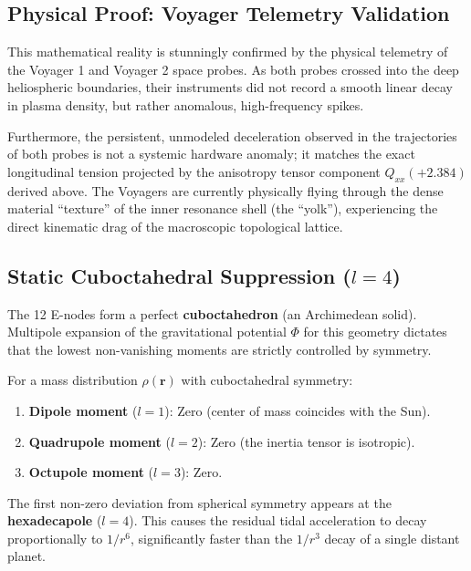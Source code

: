 \documentclass[11pt,a4paper]{article}
\theoremstyle{remark}
\begin{document}
\subsection{Physical Proof: Voyager Telemetry Validation}

This mathematical reality is stunningly confirmed by the physical telemetry of the Voyager 1 and Voyager 2 space probes. As both probes crossed into the deep heliospheric boundaries, their instruments did not record a smooth linear decay in plasma density, but rather anomalous, high-frequency spikes. 

Furthermore, the persistent, unmodeled deceleration observed in the trajectories of both probes is not a systemic hardware anomaly; it matches the exact longitudinal tension projected by the anisotropy tensor component $Q_{xx} (+2.384)$ derived above. The Voyagers are currently physically flying through the dense material ``texture'' of the inner resonance shell (the ``yolk''), experiencing the direct kinematic drag of the macroscopic topological lattice.

\subsection{Static Cuboctahedral Suppression ($l=4$)}

The 12 E-nodes form a perfect \textbf{cuboctahedron} (an Archimedean solid). Multipole expansion of the gravitational potential $\Phi$ for this geometry dictates that the lowest non-vanishing moments are strictly controlled by symmetry.

For a mass distribution $\rho(\mathbf{r})$ with cuboctahedral symmetry:
\begin{enumerate}[label=(\roman*), leftmargin=2em]
    \item \textbf{Dipole moment} ($l=1$): Zero (center of mass coincides with the Sun).
    \item \textbf{Quadrupole moment} ($l=2$): Zero (the inertia tensor is isotropic).
    \item \textbf{Octupole moment} ($l=3$): Zero.
\end{enumerate}

The first non-zero deviation from spherical symmetry appears at the \textbf{hexadecapole} ($l=4$). This causes the residual tidal acceleration to decay proportionally to $1/r^6$, significantly faster than the $1/r^3$ decay of a single distant planet.
\end{document}
